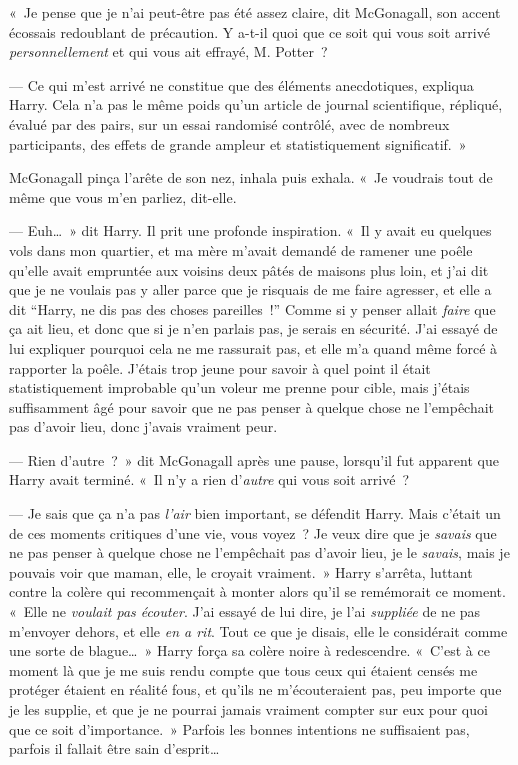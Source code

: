 «~Je pense que je n'ai peut-être pas été assez claire, dit McGonagall, son accent écossais redoublant de précaution. Y a-t-il quoi que ce soit qui vous soit arrivé \emph{personnellement} et qui vous ait effrayé, M. Potter~?

--- Ce qui m'est arrivé ne constitue que des éléments anecdotiques, expliqua Harry. Cela n'a pas le même poids qu'un article de journal scientifique, répliqué, évalué par des pairs, sur un essai randomisé contrôlé, avec de nombreux participants, des effets de grande ampleur et statistiquement significatif.~»

McGonagall pinça l'arête de son nez, inhala puis exhala.
«~Je voudrais tout de même que vous m'en parliez, dit-elle.

--- Euh…~» dit Harry. Il prit une profonde inspiration.
«~Il y avait eu quelques vols dans mon quartier, et ma mère m'avait demandé de ramener une poêle qu'elle avait empruntée aux voisins deux pâtés de maisons plus loin, et j'ai dit que je ne voulais pas y aller parce que je risquais de me faire agresser, et elle a dit “Harry, ne dis pas des choses pareilles~!”
Comme si y penser allait \emph{faire} que ça ait lieu, et donc que si je n'en parlais pas, je serais en sécurité.
J'ai essayé de lui expliquer pourquoi cela ne me rassurait pas, et elle m'a quand même forcé à rapporter la poêle.
J'étais trop jeune pour savoir à quel point il était statistiquement improbable qu'un voleur me prenne pour cible, mais j'étais suffisamment âgé pour savoir que ne pas penser à quelque chose ne l'empêchait pas d'avoir lieu, donc j'avais vraiment peur.

--- Rien d'autre~?~» dit McGonagall après une pause, lorsqu'il fut apparent que Harry avait terminé. «~Il n'y a rien d'\emph{autre} qui vous soit arrivé~?

--- Je sais que ça n'a pas \emph{l'air} bien important, se défendit Harry.
Mais c'était un de ces moments critiques d'une vie, vous voyez~?
Je veux dire que je \emph{savais} que ne pas penser à quelque chose ne l'empêchait pas d'avoir lieu, je le \emph{savais}, mais je pouvais voir que maman, elle, le croyait vraiment.~»
Harry s'arrêta, luttant contre la colère qui recommençait à monter alors qu'il se remémorait ce moment.
«~Elle ne \emph{voulait pas écouter}. J'ai essayé de lui dire, je l'ai \emph{suppliée} de ne pas m'envoyer dehors, et elle \emph{en a rit}.
Tout ce que je disais, elle le considérait comme une sorte de blague…~»
Harry força sa colère noire à redescendre.
«~C'est à ce moment là que je me suis rendu compte que tous ceux qui étaient censés me protéger étaient en réalité fous, et qu'ils ne m'écouteraient pas, peu importe que je les supplie, et que je ne pourrai jamais vraiment compter sur eux pour quoi que ce soit d'importance.~»
Parfois les bonnes intentions ne suffisaient pas, parfois il fallait être sain d'esprit…

